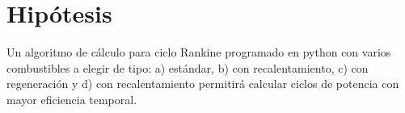 \pagebreak
\makeatletter
\let\savedchap\@makechapterhead
\def\@makechapterhead{\vspace*{-2.54cm}\savedchap}
\chapter{Hipótesis}
\let\@makechapterhead\savedchap
\makeatletter


\vspace{-35pt}
Un algoritmo de cálculo para ciclo Rankine programado en python con varios combustibles a elegir de tipo: a) estándar, b) con recalentamiento, c) con regeneración y d) con recalentamiento permitirá calcular ciclos de potencia con mayor eficiencia temporal.

\vspace{-1.54cm}

